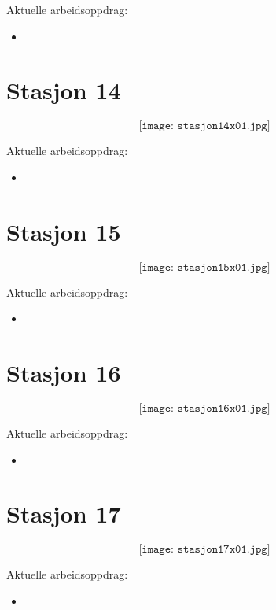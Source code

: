 Aktuelle arbeidsoppdrag:\\
\begin{itemize}[noitemsep]
	\item 
\end{itemize}

\section{Stasjon 14}

$$\texttt{[image: stasjon14x01.jpg]}$$

Aktuelle arbeidsoppdrag:\\
\begin{itemize}[noitemsep]
	\item 
\end{itemize}

\section{Stasjon 15}

$$\texttt{[image: stasjon15x01.jpg]}$$

Aktuelle arbeidsoppdrag:\\
\begin{itemize}[noitemsep]
	\item 
\end{itemize}

\section{Stasjon 16}

$$\texttt{[image: stasjon16x01.jpg]}$$

Aktuelle arbeidsoppdrag:\\
\begin{itemize}[noitemsep]
	\item 
\end{itemize}

\section{Stasjon 17}

$$\texttt{[image: stasjon17x01.jpg]}$$

Aktuelle arbeidsoppdrag:\\
\begin{itemize}[noitemsep]
	\item 
\end{itemize}

